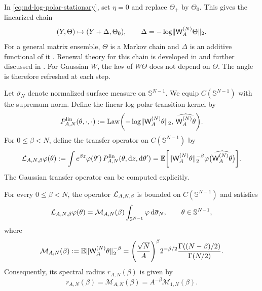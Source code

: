 \documentclass[11pt,reqno,a4paper]{article}
\newcommand{\Ee}{\E}
\begin{document}
In \cref{eq:nd-log-polar-stationary}, set $\eta=0$ and replace $\Theta_+$ by
$\Theta_0$. This gives the linearized chain
\begin{equation}\label{eq:nd-linear-markov-additive}
  (Y,\Theta)
  \mapsto
  \left(
    Y+\Delta,\Theta_0
  \right),
  \qquad
  \Delta=-\log\norm{\mathsf W_A^{(N)}\Theta}_2 .
\end{equation}
For a general matrix ensemble, $\Theta$ is a Markov chain and $\Delta$ is an
additive functional of it \cite{bougerol-lacroix1985}. Renewal theory for
this chain is developed in \cite{kesten1973} and further discussed in
\cite{buraczewski-damek-mikosch2016}. For Gaussian $W$, the law of $W\Theta$
does not depend on $\Theta$. The angle is therefore refreshed at each step.

Let $\bar\sigma_N$ denote normalized surface measure on $\mathbb S^{N-1}$. We
equip $C(\mathbb S^{N-1})$ with the supremum norm. Define the linear log-polar
transition kernel by
\begin{equation*}
  P_{A,N}^{\mathrm{lin}}(\theta,\cdot,\cdot)
  :=
  \operatorname{Law}\left(
    -\log\norm{\mathsf W_A^{(N)}\theta}_2,\,
    \widehat{\mathsf W_A^{(N)}\theta}
  \right).
\end{equation*}
For $0\leq\beta<N$, define the transfer operator on
$C(\mathbb S^{N-1})$ by
\begin{equation}\label{eq:nd-transfer-operator}
  \Lcal_{A,N,\beta}\varphi(\theta)
  :=
  \int e^{\beta z}\varphi(\theta')\,
  P_{A,N}^{\mathrm{lin}}(\theta,\mathrm{d}z,\mathrm{d}\theta')
  =
  \Ee\left[
    \norm{\mathsf W_A^{(N)}\theta}_2^{-\beta}
    \varphi\bigl(\widehat{\mathsf W_A^{(N)}\theta}\bigr)
  \right].
\end{equation}
The Gaussian transfer operator can be computed explicitly.
\begin{lemma}\label{lem:nd-gaussian-transfer}
  For every $0\leq\beta<N$, the operator $\mathcal L_{A,N,\beta}$ is bounded on
  $C(\mathbb S^{N-1})$ and satisfies
  \begin{equation}\label{eq:nd-transfer-rank-one}
    \Lcal_{A,N,\beta}\varphi(\theta)
    =
    \mathcal M_{A,N}(\beta)
    \int_{\mathbb S^{N-1}}\varphi\,\mathrm{d}\bar\sigma_N,
    \qquad
    \theta\in\mathbb S^{N-1},
  \end{equation}
  where
  \begin{equation}\label{eq:nd-gaussian-negative-moment}
    \mathcal M_{A,N}(\beta)
    :=
    \Ee\norm{\mathsf W_A^{(N)}\theta}_2^{-\beta}
    =
    \left(\frac{\sqrt N}{A}\right)^\beta
    2^{-\beta/2}
    \frac{\Gamma((N-\beta)/2)}{\Gamma(N/2)}.
  \end{equation}
  Consequently, its spectral radius $r_{A,N}(\beta)$ is given by
  \begin{equation}\label{eq:nd-pressure-scaling}
    r_{A,N}(\beta)
    =
    \mathcal M_{A,N}(\beta)
    =
    A^{-\beta}\mathcal M_{1,N}(\beta).
  \end{equation}
\end{lemma}
\end{document}

